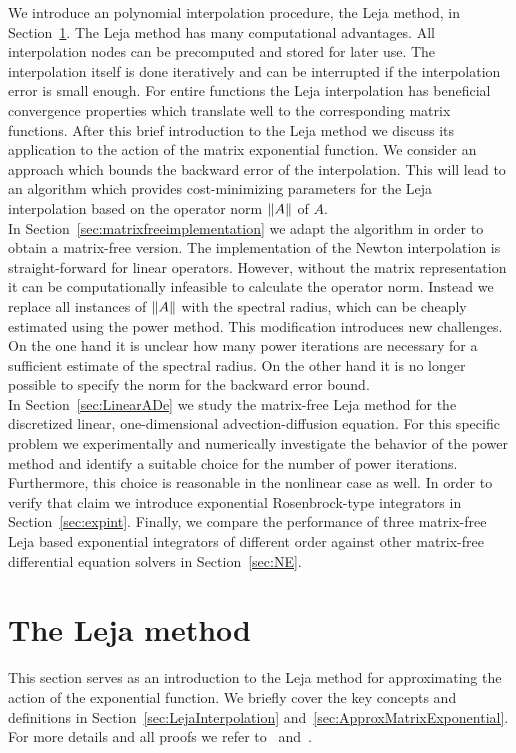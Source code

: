 \documentclass{scrartcl}
\begin{document}
	We introduce an polynomial interpolation procedure, the Leja method, in Section~\ref{sec:LejaMethod}. The Leja method has many computational advantages. All interpolation nodes can be precomputed and stored for later use. The interpolation itself is done iteratively and can be interrupted if the interpolation error is small enough. For entire functions the Leja interpolation has beneficial convergence properties which translate well to the corresponding matrix functions. After this brief introduction to the Leja method we discuss its application to the action of the matrix exponential function. We consider an approach which bounds the backward error of the interpolation. This will lead to an algorithm which provides cost-minimizing parameters for the Leja interpolation based on the operator norm $\lVert A\rVert$ of $A$. \\
	In Section~\ref{sec:matrixfreeimplementation} we adapt the algorithm in order to obtain a matrix-free version. The implementation of the Newton interpolation is straight-forward for linear operators. However, without the matrix representation it can be computationally infeasible to calculate the operator norm. Instead we replace all instances of $\lVert A\rVert$ with the spectral radius, which can be cheaply estimated using the power method. This modification introduces new challenges. On the one hand it is unclear how many power iterations are necessary for a sufficient estimate of the spectral radius. On the other hand it is no longer possible to specify the norm for the backward error bound. \\
	In Section~\ref{sec:LinearADe} we study the matrix-free Leja method for the discretized linear, one-dimensional advection-diffusion equation. For this specific problem we experimentally and numerically investigate the behavior of the power method and identify a suitable choice for the number of power iterations. Furthermore, this choice is reasonable in the nonlinear case as well. In order to verify that claim we introduce exponential Rosenbrock-type integrators in Section~\ref{sec:expint}. Finally, we compare the performance of three matrix-free Leja based exponential integrators of different order against other matrix-free differential equation solvers in Section~\ref{sec:NE}.
	

	\section{The Leja method} \label{sec:LejaMethod}
	This section serves as an introduction to the Leja method for approximating the action of the exponential function. We briefly cover the key concepts and definitions in Section~\ref{sec:LejaInterpolation} and~\ref{sec:ApproxMatrixExponential}. For more details and all proofs we refer to~\cite{advdif} and~\cite{lejarev}. 
	
\end{document}
